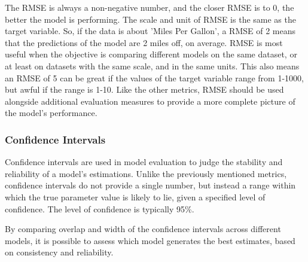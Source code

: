 \noindent The RMSE is always a non-negative number, and the closer RMSE is to 0, the better the model is performing. The scale and unit of RMSE is the same as the target variable. So, if the data is about 'Miles Per Gallon', a RMSE of 2 means that the predictions of the model are 2 miles off, on average. RMSE is most useful when the objective is comparing different models on the same dataset, or at least on datasets with the same scale, and in the same units. This also means an RMSE of 5 can be great if the values of the target variable range from 1-1000, but awful if the range is 1-10. Like the other metrics, RMSE should be used alongside additional evaluation measures to provide a more complete picture of the model’s performance.
\newpage

\subsubsection{Confidence Intervals}
Confidence intervals are used in model evaluation to judge the stability and reliability of a model's estimations. Unlike the previously mentioned metrics, confidence intervals do not provide a single number, but instead a range within which the true parameter value is likely to lie, given a specified level of confidence. The level of confidence is typically 95\%. \newline 

\noindent By comparing overlap and width of the confidence intervals across different models, it is possible to assess which model generates the best estimates, based on consistency and reliability.